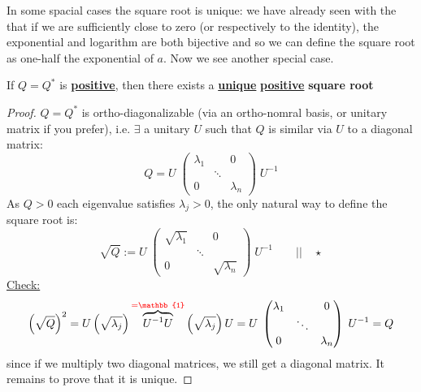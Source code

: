\documentclass[../main.tex]{subfiles}
\begin{document}
In some spacial cases the square root is unique: we have already seen with the  that if we are sufficiently close to zero (or respectively to the identity), the exponential and logarithm are both bijective and so we can define the square root as one-half the exponential of $a$. Now we see another special case.
\begin{lemma}
If $Q=Q^\ast$ is \underline{\textbf{positive}}, then there exists a \underline{\textbf{unique}} \underline{\textbf{positive}} \textbf{square root}
\end{lemma}
\begin{proof}
$Q=Q^\ast$ is ortho-diagonalizable (via an ortho-nomral basis, or unitary matrix if you prefer), i.e. $\exists$ a unitary $U$ such that $Q$ is similar via $U$ to a diagonal matrix:
\[
Q=U\;\begin{pmatrix}
\lambda_1 & & 0\\
 & \ddots & \\
0 & &\lambda_n
\end{pmatrix}\;U^{-1}
\]
As $Q>0$ each eigenvalue satisfies $\lambda_j>0$, the only natural way to define the square root is:
\[
\sqrt{Q}:=U\;\begin{pmatrix}
\sqrt{\lambda_1} & & 0\\
 & \ddots & \\
0 &  &\sqrt{\lambda_n}
\end{pmatrix}\;U^{-1} \qquad \Big|\Big| \quad \star
\]
\underline{Check:}
\[
\left(\sqrt{Q}\right)^2=U\left(\sqrt{\lambda_j}\right)\overbrace{U^{-1}U}^{{\color{red}=\mathbb{1}}}\left(\sqrt{\lambda_j}\right)U=U\;\begin{pmatrix}
\lambda_1 & & 0\\
 & \ddots & \\
0 &  &\lambda_n
\end{pmatrix}\;U^{-1}=Q
\]
since if we multiply two diagonal matrices, we still get a diagonal matrix. It remains to prove that it is unique.


\end{proof}
\end{document}
